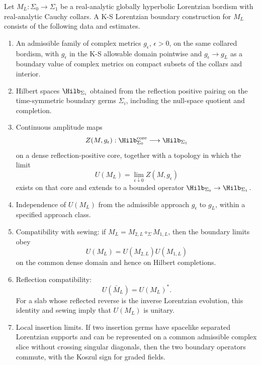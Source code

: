 \begin{construction}
\label{cons:ks-lorentzian-boundary}
Let \(M_L:\Sigma_0\to\Sigma_1\) be a real-analytic globally hyperbolic
Lorentzian bordism with real-analytic Cauchy collars.  A K-S Lorentzian
boundary construction for \(M_L\) consists of the following data and
estimates.
\begin{enumerate}[label=(\roman*)]
\item An admissible family of complex metrics \(g_\epsilon\), \(\epsilon>0\),
      on the same collared bordism, with \(g_\epsilon\) in the K-S allowable
      domain pointwise and \(g_\epsilon\to g_L\) as a boundary value of
      complex metrics on compact subsets of the collars and interior.
\item Hilbert spaces \(\Hilb_{\Sigma_i}\) obtained from the reflection
      positive pairing on the time-symmetric boundary germs \(\Sigma_i\),
      including the null-space quotient and completion.
\item Continuous amplitude maps
      \[
        Z(M,g_\epsilon):\Hilb_{\Sigma_0}^{\rm core}
        \longrightarrow \Hilb_{\Sigma_1}
      \]
      on a dense reflection-positive core, together with a topology in which
      the limit
      \[
        U(M_L)=\lim_{\epsilon\downarrow0}Z(M,g_\epsilon)
      \]
      exists on that core and extends to a bounded operator
      \(\Hilb_{\Sigma_0}\to\Hilb_{\Sigma_1}\).
\item Independence of \(U(M_L)\) from the admissible approach
      \(g_\epsilon\) to \(g_L\), within a specified approach class.
\item Compatibility with sewing: if \(M_L=M_{2,L}\circ_\Sigma M_{1,L}\), then
      the boundary limits obey
      \[
        U(M_L)=U(M_{2,L})U(M_{1,L})
      \]
      on the common dense domain and hence on Hilbert completions.
\item Reflection compatibility:
      \[
        U(\bar M_L)=U(M_L)^* .
      \]
      For a slab whose reflected reverse is the inverse Lorentzian evolution,
      this identity and sewing imply that \(U(M_L)\) is unitary.
\item Local insertion limits.  If two insertion germs have spacelike separated
      Lorentzian supports and can be represented on a common admissible
      complex slice without crossing singular diagonals, then the two
      boundary operators commute, with the Koszul sign for graded fields.
\end{enumerate}
\end{construction}

